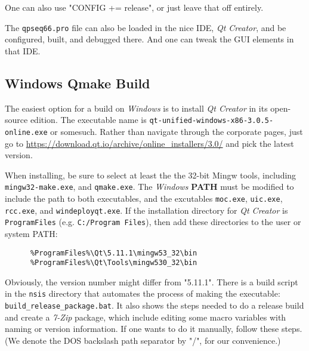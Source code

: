     One can also use "CONFIG += release", or just leave that off entirely.

    The \texttt{qpseq66.pro} file can also be loaded in the
    nice IDE, \textsl{Qt Creator}, and be configured, built, and debugged
    there.  And one can tweak the GUI elements in that IDE.

\subsection{Windows Qmake Build}
\label{subsec:seq66_build_qmake_windows}

   The easiest option for a build on \textsl{Windows} is to install 
   \textsl{Qt Creator} in its open-source edition.
   The executable name is
   \texttt{qt-unified-windows-x86-3.0.5-online.exe} or somesuch.
   Rather than navigate through the corporate pages, just go to
   \url{https://download.qt.io/archive/online_installers/3.0/} and
   pick the latest version.
   
   When installing, be sure to select at least the the 32-bit Mingw tools,
   including \texttt{mingw32-make.exe}, and
   \texttt{qmake.exe}.  The \textsl{Windows}
   \textbf{PATH} must be modified to
   include the path to both executables, and the excutables
   \texttt{moc.exe}, \texttt{uic.exe}, \texttt{rcc.exe}, and
   \texttt{windeployqt.exe}.
   If the installation directory for \textsl{Qt Creator} is
   \texttt{ProgramFiles} (e.g. \texttt{C:/Program Files}), then add
   these directories to the user or system PATH:

   \begin{verbatim}
      %ProgramFiles%\Qt\5.11.1\mingw53_32\bin
      %ProgramFiles%\Qt\Tools\mingw530_32\bin
   \end{verbatim}

   Obviously, the version number might differ from "5.11.1".
   There is a build script in the \texttt{nsis} directory that
   automates the process of making the executable:
   \texttt{build\_release\_package.bat}.
   It also shows the steps needed to do a release build and create a
   \textsl{7-Zip} package, which include editing some macro variables with
   naming or version information.  If one wants to do it manually,
   follow these steps.  (We denote the DOS backslash path separator
   by "/", for our convenience.)

